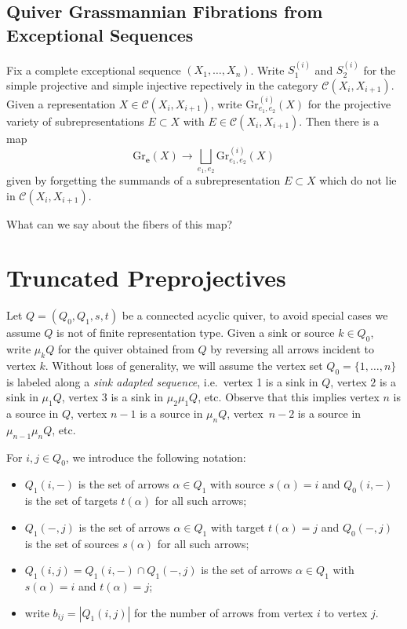 \documentclass{amsart}
\numberwithin{equation}{section}
\newcommand{\bfe}{\mathbf{e}}
\newcommand{\cC}{\mathcal{C}}
\newcommand{\Gr}{\mathrm{Gr}}
\begin{document}
\subsection{Quiver Grassmannian Fibrations from Exceptional Sequences}

Fix a complete exceptional sequence $(X_1,\ldots,X_n)$.
Write $S_1^{(i)}$ and $S_2^{(i)}$ for the simple projective and simple injective repectively in the category $\cC(X_i,X_{i+1})$.
Given a representation $X\in\cC(X_i,X_{i+1})$, write $\Gr^{(i)}_{e_1,e_2}(X)$ for the projective variety of subrepresentations $E\subset X$ with $E\in\cC(X_i,X_{i+1})$.
Then there is a map
\[\Gr_\bfe(X)\to\bigsqcup_{e_1,e_2} \Gr^{(i)}_{e_1,e_2}(X)\]
given by forgetting the summands of a subrepresentation $E\subset X$ which do not lie in $\cC(X_i,X_{i+1})$.

What can we say about the fibers of this map?



\section{Truncated Preprojectives}

Let $Q=(Q_0,Q_1,s,t)$ be a connected acyclic quiver, to avoid special cases we assume $Q$ is not of finite representation type.
Given a sink or source $k\in Q_0$, write $\mu_k Q$ for the quiver obtained from $Q$ by reversing all arrows incident to vertex $k$.
Without loss of generality, we will assume the vertex set $Q_0=\{1,\ldots,n\}$ is labeled along a \emph{sink adapted sequence}, i.e.~vertex 1 is a sink in $Q$, vertex $2$ is a sink in $\mu_1 Q$, vertex $3$ is a sink in $\mu_2\mu_1 Q$, etc.
Observe that this implies vertex $n$ is a source in $Q$, vertex $n-1$ is a source in $\mu_n Q$, vertex~$n-2$ is a source in $\mu_{n-1}\mu_n Q$, etc.

For $i,j\in Q_0$, we introduce the following notation:
\begin{itemize}
  \item $Q_1(i,-)$ is the set of arrows $\alpha\in Q_1$ with source $s(\alpha)=i$ and $Q_0(i,-)$ is the set of targets $t(\alpha)$ for all such arrows;
  \item $Q_1(-,j)$ is the set of arrows $\alpha\in Q_1$ with target $t(\alpha)=j$ and $Q_0(-,j)$ is the set of sources $s(\alpha)$ for all such arrows;
  \item $Q_1(i,j)=Q_1(i,-)\cap Q_1(-,j)$ is the set of arrows $\alpha\in Q_1$ with $s(\alpha)=i$ and $t(\alpha)=j$;
  \item write $b_{ij}=|Q_1(i,j)|$ for the number of arrows from vertex $i$ to vertex $j$.
\end{itemize}
\end{document}
